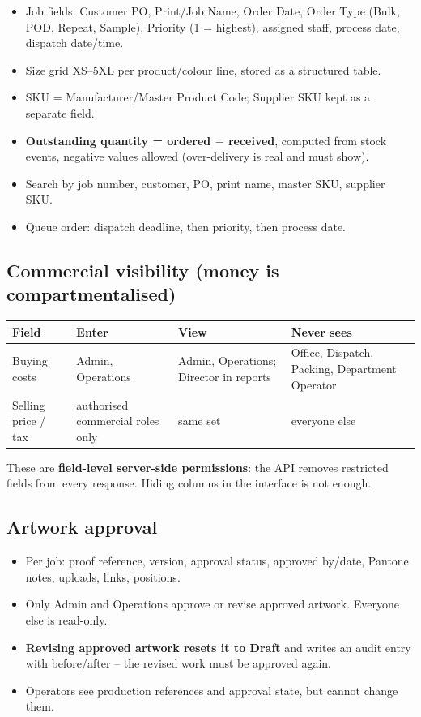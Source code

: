 \begin{itemize}
  \item Job fields: Customer PO, Print/Job Name, Order Date, Order Type (Bulk, POD,
        Repeat, Sample), Priority (1 = highest), assigned staff, process date,
        dispatch date/time.
  \item Size grid XS--5XL per product/colour line, stored as a structured table.
  \item SKU = Manufacturer/Master Product Code; Supplier SKU kept as a separate field.
  \item \textbf{Outstanding quantity = ordered $-$ received}, computed from stock events,
        negative values allowed (over-delivery is real and must show).
  \item Search by job number, customer, PO, print name, master SKU, supplier SKU.
  \item Queue order: dispatch deadline, then priority, then process date.
\end{itemize}

\subsection{Commercial visibility (money is compartmentalised)}

\begin{tabular}{@{}p{3.9cm} p{3.4cm} p{4.4cm} p{3.6cm}@{}}
\toprule
\textbf{Field} & \textbf{Enter} & \textbf{View} & \textbf{Never sees} \\
\midrule
Buying costs & Admin, Operations & Admin, Operations; Director in reports & Office,
  Dispatch, Packing, Department Operator \\
Selling price / tax & authorised commercial roles only & same set & everyone else \\
\bottomrule
\end{tabular}

These are \textbf{field-level server-side permissions}: the API removes restricted fields
from every response. Hiding columns in the interface is not enough.

\subsection{Artwork approval}

\begin{itemize}
  \item Per job: proof reference, version, approval status, approved by/date, Pantone
        notes, uploads, links, positions.
  \item Only Admin and Operations approve or revise approved artwork. Everyone else is
        read-only.
  \item \textbf{Revising approved artwork resets it to Draft} and writes an audit entry
        with before/after -- the revised work must be approved again.
  \item Operators see production references and approval state, but cannot change them.
\end{itemize}

